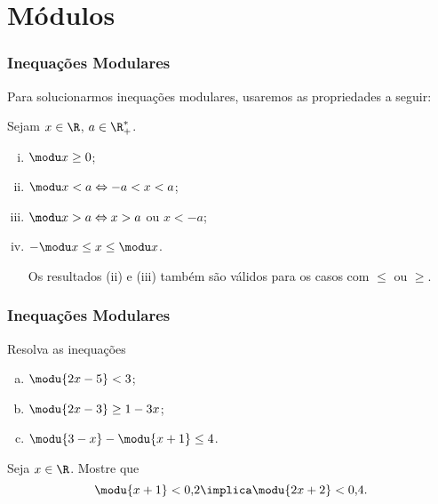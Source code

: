 \section{Módulos}
\begin{frame}
\frametitle{Inequações Modulares} 

Para solucionarmos inequações modulares, usaremos as propriedades a
seguir:
\begin{proposicao}[Propriedades]
Sejam $x \in \R$, $a\in \R^{\ast}_+ $.
\begin{enumerate}[(i)]
	\item $\modu x \geq 0$;
	\item $\modu x < a \Leftrightarrow -a < x < a$;
	\item $\modu x > a \Leftrightarrow x > a$ ou $x < -a$;
	\item $-\modu x \leq x \leq \modu x$.

	Os resultados (ii) e (iii) também são válidos para os casos com $\leq$ ou
	$\geq$.
\end{enumerate}

\end{proposicao}

\end{frame}

\begin{frame}
\frametitle{Inequações Modulares} 
\begin{exemplo}
Resolva as inequações
\begin{enumerate}[(a)]
	\item  $\modu {2x-5} < 3$;
	\item $\modu{2x-3} \geq 1-3x$;
	\item $\modu{3-x} - \modu{x+1} \leq 4$.
\end{enumerate}

\end{exemplo}\pause

\begin{exemplo}
	Seja $x \in \R$. Mostre que
	$$\modu{x + 1}< 0{,}2 \implica \modu{2x +2 }< 0{,}4.$$ 
\end{exemplo}


\end{frame}

